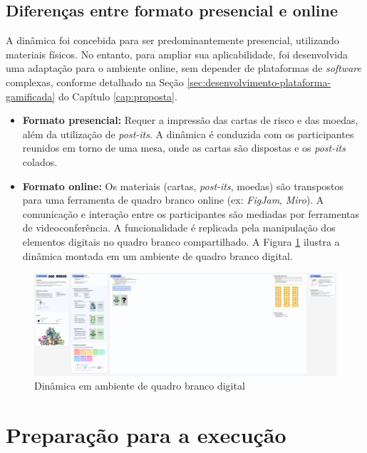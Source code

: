 \documentclass[
	12pt,
	openright,
	twoside,
	a4paper,
	english,
	brazil
	]{abntex2}
\begin{document}
\subsection{Diferenças entre formato presencial e online}
\label{sec:formato-presencial-online}

A dinâmica foi concebida para ser predominantemente presencial, utilizando materiais físicos. No entanto, para ampliar sua aplicabilidade, foi desenvolvida uma adaptação para o ambiente online, sem depender de plataformas de \textit{software} complexas, conforme detalhado na Seção \ref{sec:desenvolvimento-plataforma-gamificada} do Capítulo \ref{cap:proposta}.

\begin{itemize}
\item \textbf{Formato presencial:} Requer a impressão das cartas de risco e das moedas, além da utilização de \textit{post-its}. A dinâmica é conduzida com os participantes reunidos em torno de uma mesa, onde as cartas são dispostas e os \textit{post-its} colados.
\item \textbf{Formato online:} Os materiais (cartas, \textit{post-its}, moedas) são transpostos para uma ferramenta de quadro branco online (ex: \textit{FigJam}, \textit{Miro}). A comunicação e interação entre os participantes são mediadas por ferramentas de videoconferência. A funcionalidade é replicada pela manipulação dos elementos digitais no quadro branco compartilhado. A Figura \ref{dinamica-online} ilustra a dinâmica montada em um ambiente de quadro branco digital.
\end{itemize}

\begin{figure}[H]
\centering
\caption{\label{dinamica-online} Dinâmica em ambiente de quadro branco digital}
\includegraphics[width=\textwidth]{dinamica-online}
\end{figure}

\section{Preparação para a execução}
\label{sec:preparacao-execucao}
\end{document}

